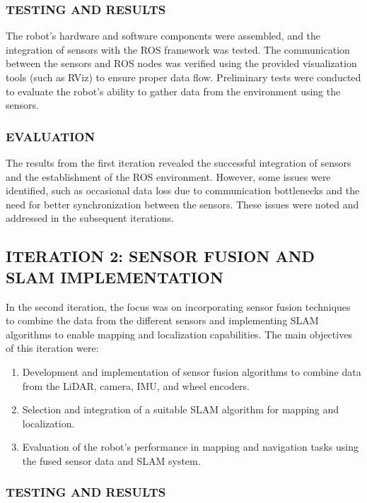 \documentclass[12pt]{article}
\begin{document}
\subsubsection{TESTING AND RESULTS}

The robot's hardware and software components were assembled, and the integration of sensors with the ROS framework was tested. The communication between the sensors and ROS nodes was verified using the provided visualization tools (such as RViz) to ensure proper data flow. Preliminary tests were conducted to evaluate the robot's ability to gather data from the environment using the sensors.

\subsubsection{EVALUATION}

The results from the first iteration revealed the successful integration of sensors and the establishment of the ROS environment. However, some issues were identified, such as occasional data loss due to communication bottlenecks and the need for better synchronization between the sensors. These issues were noted and addressed in the subsequent iterations.

\subsection{ITERATION 2: SENSOR FUSION AND SLAM IMPLEMENTATION}

In the second iteration, the focus was on incorporating sensor fusion techniques to combine the data from the different sensors and implementing SLAM algorithms to enable mapping and localization capabilities. The main objectives of this iteration were:

\begin{enumerate}
    \item Development and implementation of sensor fusion algorithms to combine data from the LiDAR, camera, IMU, and wheel encoders.
    \item Selection and integration of a suitable SLAM algorithm for mapping and localization.
    \item Evaluation of the robot's performance in mapping and navigation tasks using the fused sensor data and SLAM system.
\end{enumerate}

\subsubsection{TESTING AND RESULTS}
\end{document}

